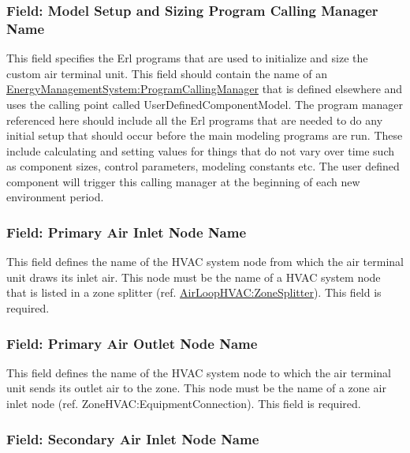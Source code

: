 \subsubsection{Field: Model Setup and Sizing Program Calling Manager Name}\label{field-model-setup-and-sizing-program-calling-manager-name-1}

This field specifies the Erl programs that are used to initialize and size the custom air terminal unit. This field should contain the name of an \hyperref[energymanagementsystemprogramcallingmanager]{\hyperref[energymanagementsystemprogram]{EnergyManagementSystem:Program}CallingManager} that is defined elsewhere and uses the calling point called UserDefinedComponentModel. The program manager referenced here should include all the Erl programs that are needed to do any initial setup that should occur before the main modeling programs are run. These include calculating and setting values for things that do not vary over time such as component sizes, control parameters, modeling constants etc. The user defined component will trigger this calling manager at the beginning of each new environment period.

\subsubsection{Field: Primary Air Inlet Node Name}\label{field-primary-air-inlet-node-name-1-000}

This field defines the name of the HVAC system node from which the air terminal unit draws its inlet air. This node must be the name of a HVAC system node that is listed in a zone splitter (ref. \hyperref[airloophvaczonesplitter]{AirLoopHVAC:ZoneSplitter}). This field is required.

\subsubsection{Field: Primary Air Outlet Node Name}\label{field-primary-air-outlet-node-name-1-000}

This field defines the name of the HVAC system node to which the air terminal unit sends its outlet air to the zone. This node must be the name of a zone air inlet node (ref. ZoneHVAC:EquipmentConnection). This field is required.

\subsubsection{Field: Secondary Air Inlet Node Name}\label{field-secondary-air-inlet-node-name-1-001}


